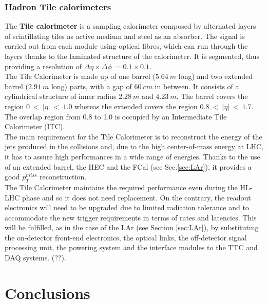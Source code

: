 \documentclass[a4paper,12pt]{article}
\begin{document}
\subsubsection{Hadron Tile calorimeters}
The \textbf{Tile calorimeter} is a sampling calorimeter composed by alternated layers of scintillating tiles as active medium and steel as an absorber. The signal is carried out from each module using optical fibres, which can run through the layers thanks to the laminated structure of the calorimeter. It is segmented, thus providing a resolution of
$\Delta\eta \times \Delta\phi\ = 0.1 \times 0.1$.\\
The Tile Calorimeter is made up of one barrel ($5.64\ m$ long) and two extended barrel ($2.91\ m$ long) parts, with a gap of $60\ cm$ in between. It consists of a cylindrical structure of inner radius $2.28\ m$ and $4.23\ m$. The barrel covers the region $0\ <\ |\eta|\ <\ 1.0$ whereas the extended covers the region $0.8\ <\ |\eta|\ <\ 1.7$. The overlap region from 0.8 to 1.0 is
occupied by an Intermediate Tile Calorimeter (ITC).\\
The main requirement for the Tile Calorimeter is to reconstruct the energy of the jets produced in the collisions and, due to the high center-of-mass energy at LHC, it has to assure 
high performances in a wide range of energies. Thanks to the use of an extended barrel, the HEC and the FCal (see Sec.\ref{sec:LAr}), it provides a good $p_T^{miss}$ reconstruction.\\[2pt]

The Tile Calorimeter maintains the required performance even during the HL-LHC phase and
so it does not need replacement. On the contrary, the readout electronics will need to be upgraded due to limited radiation tolerance and to accommodate the new trigger requirements in terms of rates and latencies. This will be fulfilled, as in the case of the LAr (see
Section \ref{sec:LAr}), by substituting the on-detector front-end electronics, the optical links, the off-detector signal processing unit, the powering system and the interface modules to the TTC and DAQ systems. (??).





\newpage
\section{Conclusions}
\label{Conclusions}
\baselineskip 25pt
\baselineskip 5pt
\baselineskip 16pt

\appendix




\end{document}
